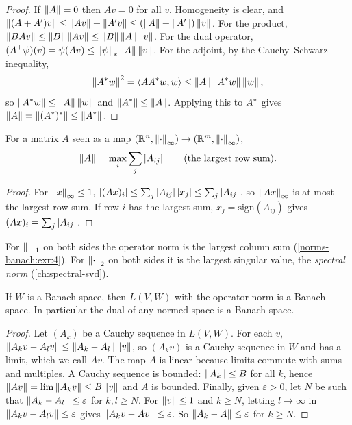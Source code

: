 \begin{notechapter}
\begin{proof}
If $\left\|A\right\| = 0$ then $Av = 0$ for all $v$. Homogeneity is clear, and
$\left\|(A + A')v\right\|\leq\left\|Av\right\| + \left\|A'v\right\|\leq(\left\|A\right\| + \left\|A'\right\|)\left\|v\right\|$. For the product, $\left\|BAv\right\|\leq\left\|B\right\|\left\|Av\right\|
\leq\left\|B\right\|\left\|A\right\|\left\|v\right\|$. For the dual operator,
$(A^{\top}\psi)(v) = \psi(Av)\leq\left\|\psi\right\|_*\left\|A\right\|\left\|v\right\|$. For the
adjoint, by the Cauchy--Schwarz inequality,
\[
  \left\|A^{*}w\right\|^2 = \left\langle AA^{*}w, w \right\rangle
  \leq\left\|A\right\|\left\|A^{*}w\right\|\left\|w\right\| ,
\]
so $\left\|A^{*}w\right\|\leq\left\|A\right\|\left\|w\right\|$ and $\left\|A^{*}\right\|\leq\left\|A\right\|$.
Applying this to $A^{*}$ gives
$\left\|A\right\| = \left\|(A^{*})^{*}\right\|\leq\left\|A^{*}\right\|$.
\end{proof}

\begin{proposition}
\label{norms-banach:prop:row-sum}
For a matrix $A$ seen as a map
$(\mathbb{R}^n, \left\|\cdot\right\|_\infty)\to(\mathbb{R}^m, \left\|\cdot\right\|_\infty)$,
\[
  \left\|A\right\| = \max_i\sum_j\left|A_{ij}\right| \qquad\text{(the largest row sum).}
\]
\end{proposition}

\begin{proof}
For $\left\|x\right\|_\infty\leq1$,
$\left|(Ax)_i\right|\leq\sum_j\left|A_{ij}\right|\left|x_j\right|\leq\sum_j\left|A_{ij}\right|$, so
$\left\|Ax\right\|_\infty$ is at most the largest row sum. If row $i$ has the
largest sum, $x_j = \mathrm{sign}(A_{ij})$ gives $(Ax)_i = \sum_j
\left|A_{ij}\right|$.
\end{proof}

For $\left\|\cdot\right\|_1$ on both sides the operator norm is the largest column
sum (\cref{norms-banach:exr:4}). For $\left\|\cdot\right\|_2$ on both sides it is
the largest singular value, the \emph{spectral norm}
(\cref{ch:spectral-svd}).

\begin{theorem}
\label{norms-banach:thm:complete}
If $W$ is a Banach space, then $L(V, W)$ with the operator norm is a Banach
space. In particular the dual of any normed space is a Banach space.
\end{theorem}

\begin{proof}
Let $(A_k)$ be a Cauchy sequence in $L(V, W)$. For each $v$,
$\left\|A_kv - A_lv\right\|\leq\left\|A_k - A_l\right\|\left\|v\right\|$, so $(A_kv)$ is a Cauchy
sequence in $W$ and has a limit, which we call $Av$. The map $A$ is linear
because limits commute with sums and multiples. A Cauchy sequence is
bounded: $\left\|A_k\right\|\leq B$ for all $k$, hence
$\left\|Av\right\| = \lim\left\|A_kv\right\|\leq B\left\|v\right\|$ and $A$ is bounded. Finally,
given $\varepsilon > 0$, let $N$ be such that
$\left\|A_k - A_l\right\|\leq\varepsilon$ for $k, l\geq N$. For $\left\|v\right\|\leq1$ and
$k\geq N$, letting $l\to\infty$ in
$\left\|A_kv - A_lv\right\|\leq\varepsilon$ gives $\left\|A_kv - Av\right\|\leq\varepsilon$.
So $\left\|A_k - A\right\|\leq\varepsilon$ for $k\geq N$.
\end{proof}


\end{notechapter}
